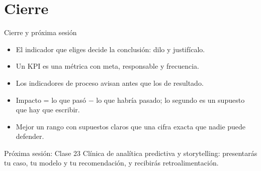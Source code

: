 \documentclass[aspectratio=169,11pt]{beamer}
\begin{document}
\section{Cierre}
\begin{frame}[t]{Cierre y próxima sesión}
  \begin{itemize}
    \small
    \item El indicador que eliges decide la conclusión: dilo y justifícalo.
    \item Un KPI es una métrica con meta, responsable y frecuencia.
    \item Los indicadores de proceso avisan antes que los de resultado.
    \item Impacto = lo que pasó $-$ lo que habría pasado; lo segundo es un
      supuesto que hay que escribir.
    \item Mejor un rango con supuestos claros que una cifra exacta que nadie
      puede defender.
  \end{itemize}
  \vspace{0.15cm}
  \begin{block}{Próxima sesión: Clase 23}
    \small Clínica de analítica predictiva y storytelling: presentarás tu
    caso, tu modelo y tu recomendación, y recibirás retroalimentación.
  \end{block}
\end{frame}

{
\begin{frame}
\end{frame}
}
\end{document}
